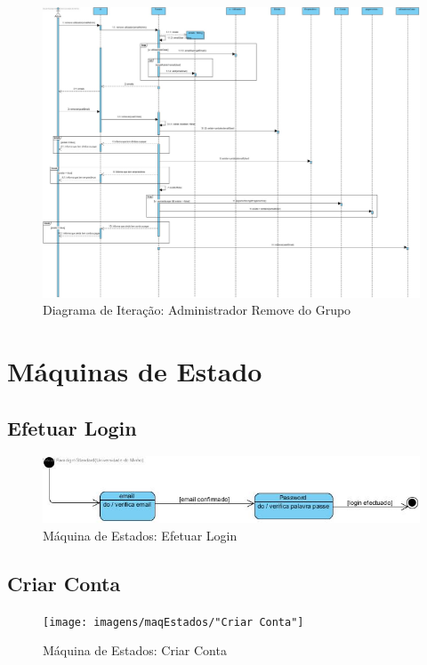 \begin{figure}[htb!]
	\centering
	\includegraphics[scale=0.27]{imagens/DiagramaIt/AdminRemoveDoGrupo}  
	\caption{Diagrama de Iteração: Administrador Remove do Grupo}  
\end{figure}




\section{Máquinas de Estado}
\subsection{Efetuar Login}

\begin{figure}[htb!]
	\centering
	\includegraphics[scale=0.7]{imagens/maqEstados/Login}  
	\caption{Máquina de Estados: Efetuar Login}  
\end{figure}


\subsection{Criar Conta}
\begin{figure}[htb!]
	\centering
	\texttt{[image: imagens/maqEstados/"Criar Conta"]}  
	\caption{Máquina de Estados: Criar Conta}  
\end{figure}

